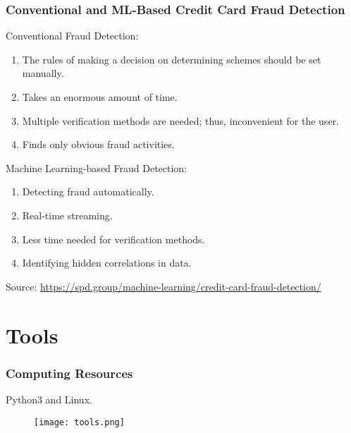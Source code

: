 \documentclass[11pt]{beamer}
\begin{document}
\begin{frame}[fragile]
  \frametitle{\normalsize{\textbf{
    Conventional and ML-Based Credit Card Fraud Detection  
  }}} 

  \scriptsize{  

    \textbullet \: Conventional Fraud Detection:

    \begin{enumerate}
      \item The rules of making a decision on determining schemes should be set manually.
      \item Takes an enormous amount of time.
      \item Multiple verification methods are needed; thus, inconvenient for the user.
      \item Finds only obvious fraud activities. 
    \end{enumerate}
    
    \textbullet \: Machine Learning-based Fraud Detection:

    \begin{enumerate}
      \item Detecting fraud automatically.
      \item Real-time streaming.
      \item Less time needed for verification methods.
      \item Identifying hidden correlations in data. 
    \end{enumerate}

    Source: \url{https://spd.group/machine-learning/credit-card-fraud-detection/}
  }
\end{frame}

\section{Tools}

\begin{frame}[fragile]
  \frametitle{\normalsize{\textbf{
    Computing Resources
  }}} 

  \scriptsize{  

    \textbullet \: Python3 and Linux.

    \begin{figure}[h!]
      \centering
      \texttt{[image: tools.png]}
    \end{figure}  
  }
\end{frame}
\end{document}
